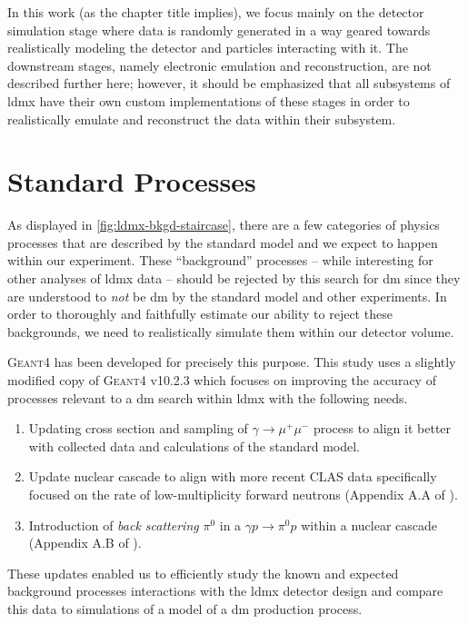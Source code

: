 In this work (as the chapter title implies), we focus mainly on the detector simulation stage where
data is randomly generated in a way geared towards
realistically modeling the detector and particles interacting with it. The downstream stages,
namely electronic emulation and reconstruction, are not described further here; however, it should
be emphasized that all subsystems of \ac{ldmx} have their own custom implementations of these
stages in order to realistically emulate and reconstruct the data within their subsystem.

\section{Standard Processes}
As displayed in \cref{fig:ldmx-bkgd-staircase}, there are a few categories of physics processes
that are described by the standard model and we expect to happen within our experiment. These
``background'' processes -- while interesting for other analyses of \ac{ldmx} data -- should be
rejected by this search for \ac{dm} since they are understood to \emph{not} be \ac{dm} by the
standard model and other experiments. In order to thoroughly and faithfully estimate our ability to
reject these backgrounds, we need to realistically simulate them within our detector volume.

\textsc{Geant4} \cite{geant4} has been developed for precisely this purpose. This study uses a slightly modified copy of \textsc{Geant4} v10.2.3 which focuses on improving the accuracy of processes relevant to a \ac{dm} search within \ac{ldmx} with the following needs.
\begin{enumerate}
  \item Updating cross section and sampling of $\gamma\to\mu^+\mu^-$ process to align it better with
        collected data and calculations of the standard model.
  \item Update nuclear cascade to align with more recent CLAS data specifically focused on the rate of
        low-multiplicity forward neutrons (Appendix A.A of \cite{ldmx-whitepaper}).
  \item Introduction of \emph{back scattering} $\pi^0$ in a $\gamma p \to \pi^0 p$ within a nuclear cascade
        (Appendix A.B of \cite{ldmx-whitepaper}).
\end{enumerate}
These updates enabled us to efficiently study the known and expected background processes interactions with the \ac{ldmx} detector design and compare this data to simulations of a model of a \ac{dm} production process.

